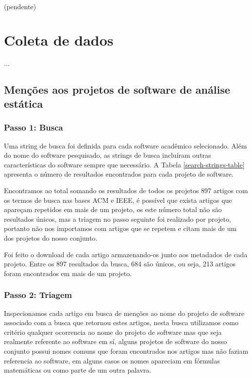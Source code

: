 (pendente)

\section{Coleta de dados}

...

\subsection{Menções aos projetos de software de análise estática}

\subsubsection{Passo 1: Busca}

Uma string de busca foi definida para cada software acadêmico selecionado.
Além do nome do software pesquisado, as strings de busca incluíram outras
características do software sempre que necessário.
A Tabela \ref{search-strings-table} apresenta o número de resultados encontrados para cada
projeto de software.



Encontramos ao total somando os resultados de todos os projetos 897 artigos
com os termos de busca nas bases ACM e IEEE, é possível que exista artigos
que apareçam repetidos em mais de um projeto, os este número total não
são resultados únicos, mas a triagem no passo seguinte foi realizado por
projeto, portanto não nos importamos com artigos que se repetem e citam
mais de um dos projetos do nosso conjunto.


Foi feito o download de cada artigo armazenando-os junto aos metadados
de cada projeto. Entre os 897 resultados da busca, 684 são únicos, ou seja,
213 artigos foram encontrados em mais de um projeto.

\subsubsection{Passo 2: Triagem}

Inspecionamos cada artigo em busca de menções ao nome do projeto de software
associado com a busca que retornou estes artigos, nesta busca utilizamos como
critério qualquer ocorrencia ao nome do projeto de software mas que seja realmente
referente ao software em sí, alguns projetos de software do nosso conjunto possui
nomes comuns que foram encontrados nos artigos mas não faziam referencia
ao software, em alguns casos os nomes apareciam em fórmulas matemáticas ou
como parte de um outra palavra.

